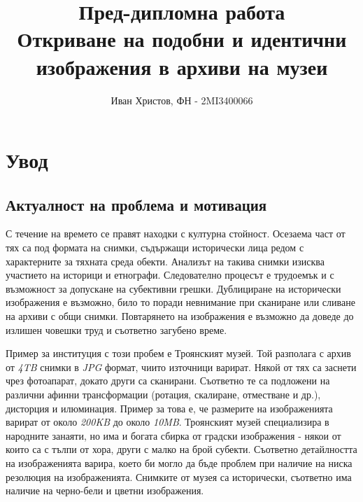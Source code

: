 \documentclass[a4paper,12pt]{article}
\begin{document}
\title{
    Пред-дипломна работа\\
    \large Откриване на подобни и идентични изображения в архиви на музеи}
\author{Иван Христов, ФН - 2MI3400066}

\maketitle


\pagebreak

\section{Увод}

\subsection{Актуалност на проблема и мотивация}

С течение на времето се правят находки с културна стойност. Осезаема част от тях са под формата на снимки, съдържащи исторически лица редом с характерните за тяхната среда обекти. Анализът на такива снимки изисква участието на историци и етнографи. Следователно процесът е трудоемък и с възможност за допускане на субективни грешки. Дублициране на исторически изображения е възможно, било то поради невнимание при сканиране или сливане на архиви с общи снимки. Повтарянето на изображения е възможно да доведе до излишен човешки труд и съответно загубено време.

\bigbreak

Пример за институция с този пробем е Троянският музей. Той разполага с архив от \textit{4TB} снимки в \textit{JPG} формат, чиито източници варират. Някой от тях са заснети чрез фотоапарат, докато други са сканирани. Съответно те са подложени на различни афинни трансформации (ротация, скалиране, отместване и др.), дисторция и илюминация. Пример за това е, че размерите на изображенията варират от около \textit{200KB} до около \textit{10MB}. Троянският музей специализира в народните занаяти, но има и богата сбирка от градски изображения - някои от които са с тълпи от хора, други с малко на брой субекти. Съответно детайлността на изображенията варира, което би могло да бъде проблем при наличие на ниска резолюция на изображенията. Снимките от музея са исторически, съответно има наличие на черно-бели и цветни изображения.
\end{document}
